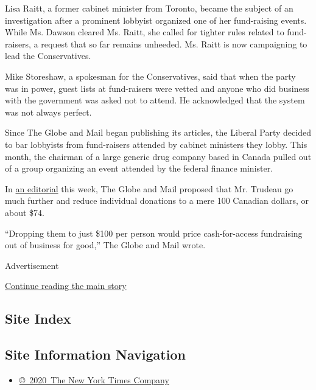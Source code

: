 Lisa Raitt, a former cabinet minister from Toronto, became the subject
of an investigation after a prominent lobbyist organized one of her
fund-raising events. While Ms. Dawson cleared Ms. Raitt, she called for
tighter rules related to fund-raisers, a request that so far remains
unheeded. Ms. Raitt is now campaigning to lead the Conservatives.

Mike Storeshaw, a spokesman for the Conservatives, said that when the
party was in power, guest lists at fund-raisers were vetted and anyone
who did business with the government was asked not to attend. He
acknowledged that the system was not always perfect.

Since The Globe and Mail began publishing its articles, the Liberal
Party decided to bar lobbyists from fund-raisers attended by cabinet
ministers they lobby. This month, the chairman of a large generic drug
company based in Canada pulled out of a group organizing an event
attended by the federal finance minister.

In
\href{http://www.theglobeandmail.com/opinion/editorials/on-cash-for-access-justin-trudeau-picks-up-where-kathleen-wynne-left-off/article32988739/}{an
editorial} this week, The Globe and Mail proposed that Mr. Trudeau go
much further and reduce individual donations to a mere 100 Canadian
dollars, or about \$74.

``Dropping them to just \$100 per person would price cash-for-access
fundraising out of business for good,'' The Globe and Mail wrote.

Advertisement

\protect\hyperlink{after-bottom}{Continue reading the main story}

\hypertarget{site-index}{%
\subsection{Site Index}\label{site-index}}

\hypertarget{site-information-navigation}{%
\subsection{Site Information
Navigation}\label{site-information-navigation}}

\begin{itemize}
\tightlist
\item
  \href{https://help.nytimes.com/hc/en-us/articles/115014792127-Copyright-notice}{©~2020~The
  New York Times Company}
\end{itemize}


